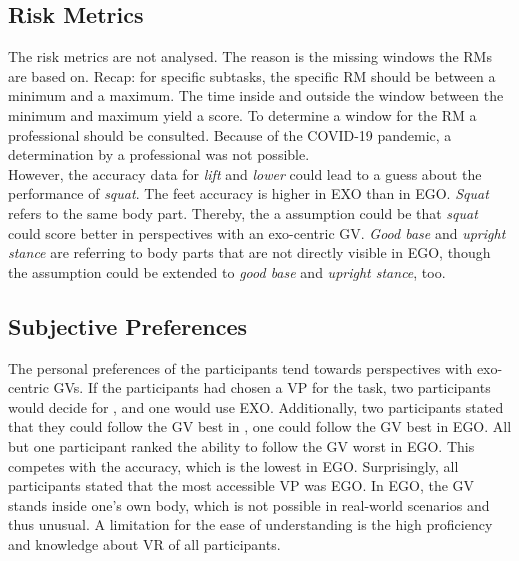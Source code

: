 \subsection{Risk Metrics}
The risk metrics are not analysed. The reason is the missing windows the RMs are based on. Recap: for specific subtasks, the specific RM should be between a minimum and a maximum. The time inside and outside the window between the minimum and maximum yield a score. To determine a window for the RM a professional should be consulted. Because of the COVID-19 pandemic, a determination by a professional was not possible.\\
However, the accuracy data for \textit{lift} and \textit{lower} could lead to a guess about the performance of \textit{squat}. The feet accuracy is higher in EXO than in EGO. \textit{Squat} refers to the same body part. Thereby, the a assumption could be that \textit{squat} could score better in perspectives with an exo-centric GV. \textit{Good base} and \textit{upright stance} are referring to body parts that are not directly visible in EGO, though the assumption could be extended to \textit{good base} and \textit{upright stance}, too.

\subsection{Subjective Preferences}
The personal preferences of the participants tend towards perspectives with exo-centric GVs. If the participants had chosen a VP for the task, two participants would decide for \combi, and one would use EXO. Additionally, two participants stated that they could follow the GV best in \combi, one could follow the GV best in EGO. All but one participant ranked the ability to follow the GV worst in EGO. This competes with the accuracy, which is the lowest in EGO. Surprisingly, all participants stated that the most accessible VP was EGO. In EGO, the GV stands inside one's own body, which is not possible in real-world scenarios and thus unusual. A limitation for the ease of understanding is the high proficiency and knowledge about VR of all participants.
